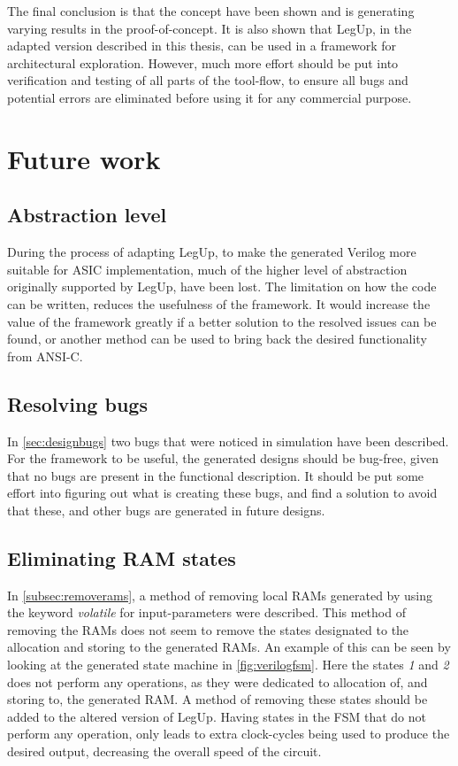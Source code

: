 The final conclusion is that the concept have been shown and is generating varying results in the proof-of-concept. It is also shown that LegUp, in the adapted version described in this thesis, can be used in a framework for architectural exploration. However, much more effort should be put into verification and testing of all parts of the tool-flow, to ensure all bugs and potential errors are eliminated before using it for any commercial purpose.
\section{Future work}
\label{sec:futurework} 
\subsection{Abstraction level}
During the process of adapting LegUp, to make the generated Verilog more suitable for ASIC implementation, much of the higher level of abstraction originally supported by LegUp, have been lost. The limitation on how the code can be written, reduces the usefulness of the framework. It would increase the value of the framework greatly if a better solution to the resolved issues can be found, or another method can be used to bring back the desired functionality from ANSI-C.

\subsection{Resolving bugs}
In \cref{sec:designbugs} two bugs that were noticed in simulation have been described. For the framework to be useful, the generated designs should be bug-free, given that no bugs are present in the functional description. It should be put some effort into figuring out what is creating these bugs, and find a solution to avoid that these, and other bugs are generated in future designs.

\subsection{Eliminating RAM states}
In \cref{subsec:removerams}, a method of removing local RAMs generated by using the keyword \textit{volatile} for input-parameters were described. This method of removing the RAMs does not seem to remove the states designated to the allocation and storing to the generated RAMs. An example of this can be seen by looking at the generated state machine in \cref{fig:verilogfsm}. Here the states \textit{1} and \textit{2} does not perform any operations, as they were dedicated to allocation of, and storing to, the generated RAM. A method of removing these states should be added to the altered version of LegUp. Having states in the FSM that do not perform any operation, only leads to extra clock-cycles being used to produce the desired output, decreasing the overall speed of the circuit.

